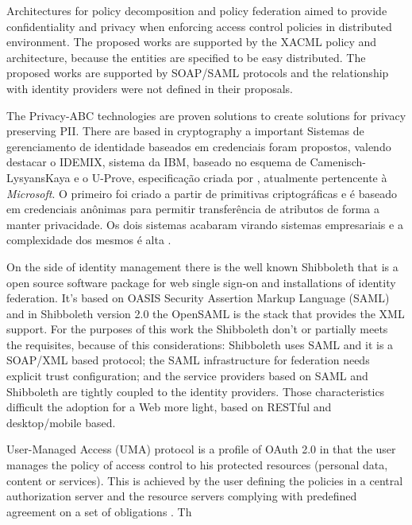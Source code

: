 \documentclass{doublecol-new}
\begin{document}
Architectures for policy decomposition \cite{lin2008policy} and policy federation \cite{decat2012toward,decat2013federated,decat2014middleware} aimed to provide confidentiality and privacy when enforcing access control policies in distributed environment. The proposed works are supported by the XACML policy and architecture, because the entities are specified to be easy distributed. The proposed works are supported by SOAP/SAML protocols and the relationship with identity providers were not defined in their proposals. 

The Privacy-ABC technologies are proven solutions to create solutions for privacy preserving PII. There are based in cryptography a important 
Sistemas de gerenciamento de identidade baseados em credenciais foram propostos, valendo destacar o IDEMIX\cite{camenisch2002design}, sistema da IBM, baseado no esquema de Camenisch-LysyansKaya \cite{camenisch2001efficient} e o U-Prove, especificação criada por \cite{brands2000rethinking}, atualmente pertencente à \textit{Microsoft}. O primeiro foi criado a partir de primitivas criptográficas e é baseado em credenciais anônimas para permitir transferência de atributos de forma a manter privacidade. Os dois sistemas acabaram virando sistemas empresariais e a complexidade dos mesmos é alta \cite{nogueira2014aprimoramento}.

On the side of identity management there is the well known Shibboleth \cite{erdos2002shibboleth} that is a open source software package for web single sign-on and installations of identity federation. It's based on OASIS Security Assertion Markup Language (SAML) and in Shibboleth version 2.0 the OpenSAML is the stack that provides the XML support. For the purposes of this work the Shibboleth don't or partially meets the requisites, because of this considerations: Shibboleth uses SAML and it is a SOAP/XML based protocol; the SAML infrastructure for federation needs explicit trust configuration; and the service providers based on SAML and Shibboleth are tightly coupled to the identity providers. Those characteristics difficult the adoption for a Web more light, based on RESTful and desktop/mobile based.

User-Managed Access (UMA)\cite{hardjono-oauth-umacore-14,machulak2010user} protocol is a profile of OAuth 2.0 in that the user manages the policy of access control to his protected resources (personal data, content or services). This is achieved by the user defining the policies in a central authorization server and the resource servers complying with predefined agreement on a set of obligations \citep{maler-oauth-umatrust-03}. Th
\end{document}
